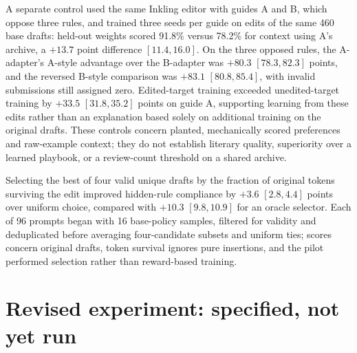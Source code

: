 \documentclass[10pt,twocolumn,letterpaper]{article}
\newcommand{\claim}[2]{#2}
\begin{document}
\claim{C37}{A separate control used the same Inkling editor with guides A and B, which oppose three rules, and trained three seeds per guide on edits of the same 460 base drafts: held-out weights scored 91.8\% versus 78.2\% for context using A's archive, a $+13.7$ point difference $[11.4,16.0]$.}
\claim{C38}{On the three opposed rules, the A-adapter's A-style advantage over the B-adapter was $+80.3$ $[78.3,82.3]$ points, and the reversed B-style comparison was $+83.1$ $[80.8,85.4]$, with invalid submissions still assigned zero.}
\claim{C39}{Edited-target training exceeded unedited-target training by $+33.5$ $[31.8,35.2]$ points on guide A, supporting learning from these edits rather than an explanation based solely on additional training on the original drafts.}
\claim{C40}{These controls concern planted, mechanically scored preferences and raw-example context; they do not establish literary quality, superiority over a learned playbook, or a review-count threshold on a shared archive.}

\claim{C41}{Selecting the best of four valid unique drafts by the fraction of original tokens surviving the edit improved hidden-rule compliance by $+3.6$ $[2.8,4.4]$ points over uniform choice, compared with $+10.3$ $[9.8,10.9]$ for an oracle selector.}
\claim{C42}{Each of 96 prompts began with 16 base-policy samples, filtered for validity and deduplicated before averaging four-candidate subsets and uniform ties; scores concern original drafts, token survival ignores pure insertions, and the pilot performed selection rather than reward-based training.}

\section{Revised experiment: specified, not yet run}
\end{document}
